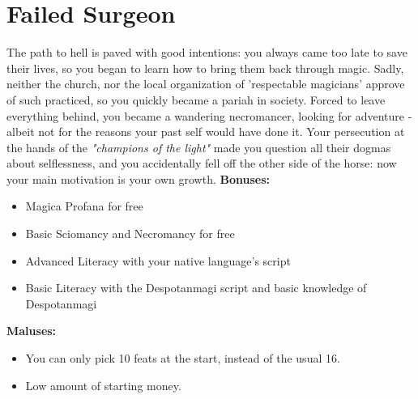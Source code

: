 \section{Failed Surgeon}
The path to hell is paved with good intentions: you always came too late to save their lives, so you began to learn how to bring them back through magic. Sadly, neither the church, nor the local organization of 'respectable magicians' approve of such practiced, so you quickly became a pariah in society. Forced to leave everything behind, you became a wandering necromancer, looking for adventure - albeit not for the reasons your past self would have done it. Your persecution at the hands of the \textit{"champions of the light"} made you question all their dogmas about selflessness, and you accidentally fell off the other side of the horse: now your main motivation is your own growth. \newline
\textbf{Bonuses:}
\begin{itemize}
	\item Magica Profana for free
	\item Basic Sciomancy and Necromancy for free
	\item Advanced Literacy with your native language's script
	\item Basic Literacy with the Despotanmagi script and basic knowledge of Despotanmagi 
\end{itemize}
\textbf{Maluses:}
\begin{itemize}
	\item You can only pick 10 feats at the start, instead of the usual 16.
	\item Low amount of starting money.
\end{itemize}
